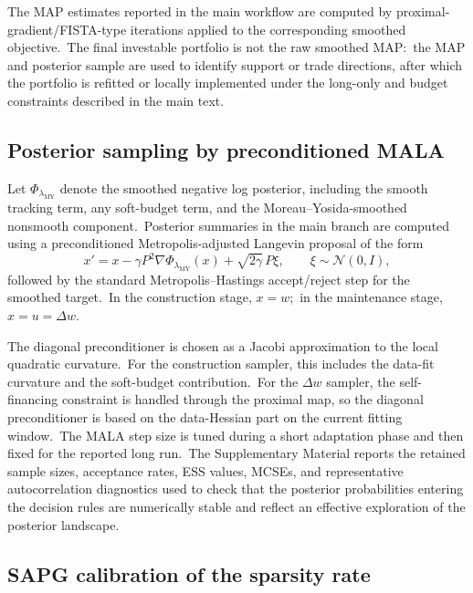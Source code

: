 \documentclass[11pt]{article}
\begin{document}
The MAP estimates reported in the main workflow are computed by proximal-gradient/FISTA-type iterations applied to the corresponding smoothed objective.\ The final investable portfolio is not the raw smoothed MAP:\ the MAP and posterior sample are used to identify support or trade directions, after which the portfolio is refitted or locally implemented under the long-only and budget constraints described in the main text.

\subsection{Posterior sampling by preconditioned MALA}
\label{app:mala-summary}

Let \(\Phi_{\lambda_{\mathrm{MY}}}\) denote the smoothed negative log posterior, including the smooth tracking term, any soft-budget term, and the Moreau--Yosida-smoothed nonsmooth component.\ Posterior summaries in the main branch are computed using a preconditioned Metropolis-adjusted Langevin proposal of the form
\[x'=x- \gamma P^2\nabla \Phi_{\lambda_{\mathrm{MY}}}(x)+ \sqrt{2\gamma}\,P\xi,
\qquad
\xi\sim\mathcal{N}(0,I),
\]
followed by the standard Metropolis--Hastings accept/reject step for the smoothed target.\ In the construction stage, \(x=w\);\ in the maintenance stage, \(x=u=\Delta w\).

The diagonal preconditioner is chosen as a Jacobi approximation to the local quadratic curvature.\ For the construction sampler, this includes the data-fit curvature and the soft-budget contribution.\ For the \(\Delta w\) sampler, the self-financing constraint is handled through the proximal map, so the diagonal preconditioner is based on the data-Hessian part on the current fitting window.\ The MALA step size is tuned during a short adaptation phase and then fixed for the reported long run.\ The Supplementary Material reports the retained sample sizes, acceptance rates, ESS values, MCSEs, and representative autocorrelation diagnostics used to check that the posterior probabilities entering the decision rules are numerically stable and reflect an effective exploration of the posterior landscape.\

\subsection{SAPG calibration of the sparsity rate}
\label{app:sapg-summary}
\end{document}
